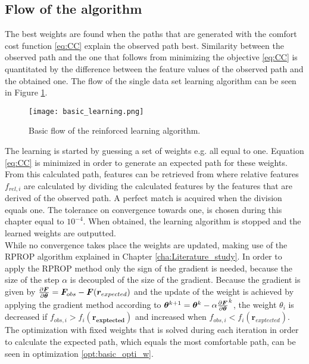 \subsection{Flow of the algorithm}
The best weights are found when the paths that are generated with the comfort cost function \ref{eq:CC} explain the observed path best. Similarity between the observed path and the one that follows from minimizing the objective \ref{eq:CC} is quantitated  by the difference between the feature values of the observed path and the obtained one. The flow of the single data set learning algorithm can be seen in Figure \ref{fig:basic learning}.

\begin{figure}[h!]
	\centering
	\texttt{[image: basic\_learning.png]}
	\caption{Basic flow of the reinforced learning algorithm.}
	\label{fig:basic learning}
\end{figure}

The learning is started by guessing a set of weights e.g. all equal to one. Equation \ref{eq:CC} is minimized in order to generate an expected path for these weights. From this calculated path, features can be retrieved from where relative features $f_{rel,i}$ are calculated by dividing the calculated features by the features that are derived of the observed path. A perfect match is acquired when the division equals one. The tolerance on convergence towards one, is chosen during this chapter equal to $10^{-4}$.  When obtained, the learning algorithm is stopped and the learned weights are outputted.\\

While no convergence takes place the weights are updated, making use of the RPROP algorithm explained in Chapter \ref{cha:Literature_study}. In order to apply the RPROP method only the sign of the gradient is needed, because the size of the step $\alpha$ is decoupled of the size of the gradient. Because the gradient is given by $\pdv{\bm{F}}{\bm{\theta}} = \bm{F}_{obs} - \bm{F}(\bm{r}_{expected})$  and the update of the weight is achieved by applying the gradient method according to $\bm{\theta}^{k+1} = \bm{\theta}^{k} - \alpha \pdv{\bm{F}}{\bm{\theta}}^k $, the weight $\theta_i$ is decreased if $f_{obs,i}>f_{i}(\bm{r_{exptected}})$ and increased when $f_{obs,i}<f_{i}(\bm{r}_{exptected})$. The optimization with fixed weights that is solved during each iteration in order to calculate the expected path, which equals the most comfortable path, can be seen in optimization \ref{opt:basic_opti_w}. \\

